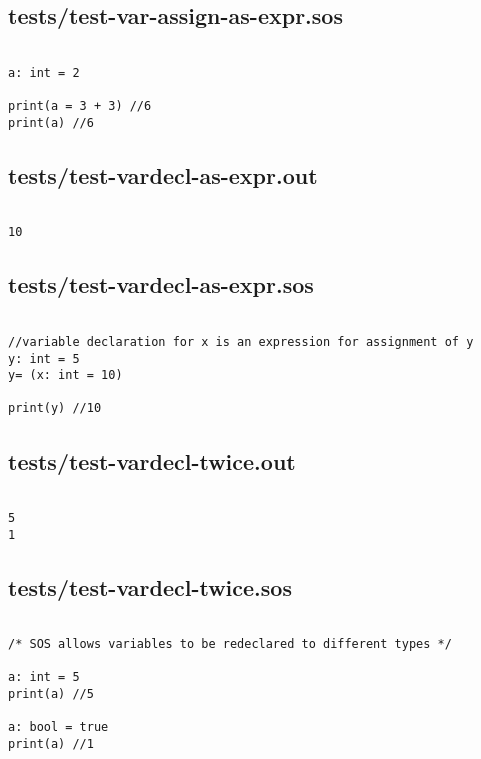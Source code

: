\documentclass[main.tex]{subfiles}
\begin{document}
\subsection{tests/test-var-assign-as-expr.sos}

\begin{lstlisting}

a: int = 2

print(a = 3 + 3) //6
print(a) //6
\end{lstlisting}

\subsection{tests/test-vardecl-as-expr.out}

\begin{lstlisting}

10
\end{lstlisting}

\subsection{tests/test-vardecl-as-expr.sos}

\begin{lstlisting}

//variable declaration for x is an expression for assignment of y
y: int = 5
y= (x: int = 10)

print(y) //10
\end{lstlisting}

\subsection{tests/test-vardecl-twice.out}

\begin{lstlisting}

5
1
\end{lstlisting}

\subsection{tests/test-vardecl-twice.sos}

\begin{lstlisting}

/* SOS allows variables to be redeclared to different types */

a: int = 5
print(a) //5

a: bool = true
print(a) //1
\end{lstlisting}
\end{document}
